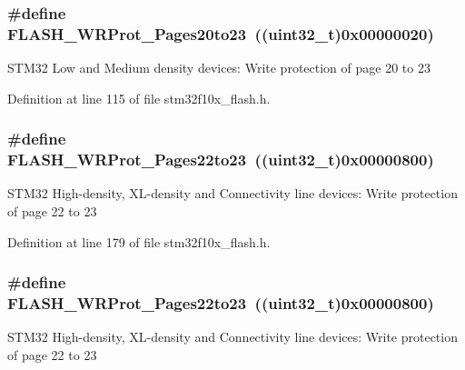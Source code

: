\subsubsection[{\texorpdfstring{F\+L\+A\+S\+H\+\_\+\+W\+R\+Prot\+\_\+\+Pages20to23}{FLASH_WRProt_Pages20to23}}]{\setlength{\rightskip}{0pt plus 5cm}\#define F\+L\+A\+S\+H\+\_\+\+W\+R\+Prot\+\_\+\+Pages20to23~(({\bf uint32\+\_\+t})0x00000020)}\hypertarget{group___option___bytes___write___protection_ga537e0f85899e13ca2ed93455e537d950}{}\label{group___option___bytes___write___protection_ga537e0f85899e13ca2ed93455e537d950}
S\+T\+M32 Low and Medium density devices\+: Write protection of page 20 to 23 

Definition at line 115 of file stm32f10x\+\_\+flash.\+h.

\subsubsection[{\texorpdfstring{F\+L\+A\+S\+H\+\_\+\+W\+R\+Prot\+\_\+\+Pages22to23}{FLASH_WRProt_Pages22to23}}]{\setlength{\rightskip}{0pt plus 5cm}\#define F\+L\+A\+S\+H\+\_\+\+W\+R\+Prot\+\_\+\+Pages22to23~(({\bf uint32\+\_\+t})0x00000800)}\hypertarget{group___option___bytes___write___protection_ga58394c78e6b08542381ade1674efe62c}{}\label{group___option___bytes___write___protection_ga58394c78e6b08542381ade1674efe62c}
S\+T\+M32 High-\/density, X\+L-\/density and Connectivity line devices\+: Write protection of page 22 to 23 

Definition at line 179 of file stm32f10x\+\_\+flash.\+h.

\subsubsection[{\texorpdfstring{F\+L\+A\+S\+H\+\_\+\+W\+R\+Prot\+\_\+\+Pages22to23}{FLASH_WRProt_Pages22to23}}]{\setlength{\rightskip}{0pt plus 5cm}\#define F\+L\+A\+S\+H\+\_\+\+W\+R\+Prot\+\_\+\+Pages22to23~(({\bf uint32\+\_\+t})0x00000800)}\hypertarget{group___option___bytes___write___protection_ga58394c78e6b08542381ade1674efe62c}{}\label{group___option___bytes___write___protection_ga58394c78e6b08542381ade1674efe62c}
S\+T\+M32 High-\/density, X\+L-\/density and Connectivity line devices\+: Write protection of page 22 to 23 

